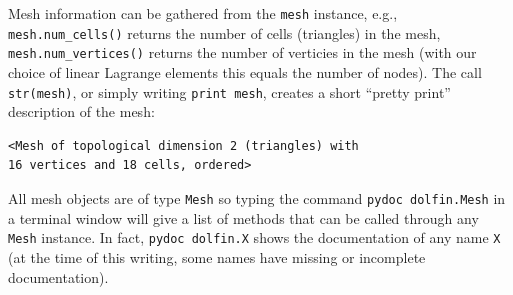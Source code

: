 Mesh information can be gathered from the {\fontsize{12pt}{12pt}\verb!mesh!} instance, e.g.,
{\fontsize{12pt}{12pt}\verb!mesh.num_cells()!} returns the number of cells (triangles) in
the mesh, {\fontsize{12pt}{12pt}\verb!mesh.num_vertices()!} returns the number of verticies
in the mesh (with our choice of linear Lagrange elements this equals
the number of nodes). The call {\fontsize{12pt}{12pt}\verb!str(mesh)!}, or simply writing
{\fontsize{12pt}{12pt}\texttt{print mesh}},
creates a short ``pretty print''
description of the mesh:
\begin{Verbatim}[fontsize=\fontsize{10pt}{10pt},tabsize=8,baselinestretch=1.05,
fontfamily=tt,xleftmargin=7mm]
<Mesh of topological dimension 2 (triangles) with
16 vertices and 18 cells, ordered>
\end{Verbatim}
\noindent
All mesh objects are of type {\fontsize{12pt}{12pt}\texttt{Mesh}} so typing the command
{\fontsize{12pt}{12pt}\texttt{pydoc dolfin.Mesh}} in a terminal window
will give a list of methods that can be called through any
{\fontsize{12pt}{12pt}\texttt{Mesh}} instance. In fact, {\fontsize{12pt}{12pt}\texttt{pydoc dolfin.X}} shows the
documentation of
any \dolfin{} name {\fontsize{12pt}{12pt}\texttt{X}} (at the time of this writing, some names
have missing or incomplete documentation).

